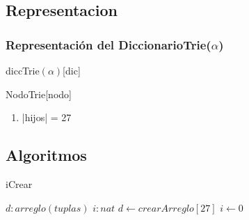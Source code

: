 \subsection{Representacion}
  
  \subsubsection{Representaci\'on del DiccionarioTrie($\alpha$)}
  \begin{Estructura}{diccTrie$(\alpha)$}[dic]
    \begin{Tupla}[dic]
    \end{Tupla}
\end{Estructura}

  \begin{Estructura}{NodoTrie}[nodo]
    \begin{Tupla}[nodo]
    \end{Tupla}
\end{Estructura}

  \begin{enumerate}
  \item |hijos| = 27
  \end{enumerate}


\subsection{Algoritmos}


\begin{algorithm}
\caption{iCrear}
\begin{algorithmic}
\State $d: arreglo(tuplas)$
\State $i: nat$
\State $d\gets crearArreglo[27]$
\State $i\gets 0$

\EndWhile
\end{algorithmic}
\end{algorithm}
